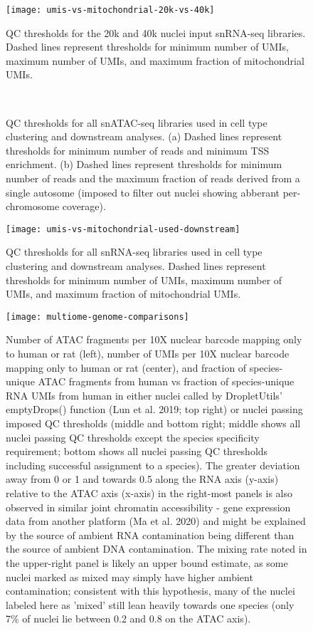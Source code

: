 \documentclass{article}
\begin{document}
\begin{figure}
\texttt{[image: umis-vs-mitochondrial-20k-vs-40k]}
\caption{QC thresholds for the 20k and 40k nuclei input snRNA-seq libraries. Dashed lines represent thresholds for minimum number of UMIs, maximum number of UMIs, and maximum fraction of mitochondrial UMIs.}
\end{figure} 

\begin{figure}
	\\
	\caption{QC thresholds for all snATAC-seq libraries used in cell type clustering and downstream analyses. (a) Dashed lines represent thresholds for minimum number of reads and minimum TSS enrichment. (b) Dashed lines represent thresholds for minimum number of reads and the maximum fraction of reads derived from a single autosome (imposed to filter out nuclei showing abberant per-chromosome coverage).}
\end{figure} 

\begin{figure}
\texttt{[image: umis-vs-mitochondrial-used-downstream]}
\caption{QC thresholds for all snRNA-seq libraries used in cell type clustering and downstream analyses. Dashed lines represent thresholds for minimum number of UMIs, maximum number of UMIs, and maximum fraction of mitochondrial UMIs.}
\end{figure} 

\begin{figure}
	\texttt{[image: multiome-genome-comparisons]}
	\caption{Number of ATAC fragments per 10X nuclear barcode mapping only to human or rat (left), number of UMIs per 10X nuclear barcode mapping only to human or rat (center), and fraction of species-unique ATAC fragments from human vs fraction of species-unique RNA UMIs from human in either nuclei called by DropletUtils' emptyDrops() function (Lun et al. 2019; top right) or nuclei passing imposed QC thresholds (middle and bottom right; middle shows all nuclei passing QC thresholds except the species specificity requirement; bottom shows all nuclei passing QC thresholds including successful assignment to a species). The greater deviation away from 0 or 1 and towards 0.5 along the RNA axis (y-axis) relative to the ATAC axis (x-axis) in the right-most panels is also observed in similar joint chromatin accessibility - gene expression data from another platform (Ma et al. 2020) and might be explained by the source of ambient RNA contamination being different than the source of ambient DNA contamination. The mixing rate noted in the upper-right panel is likely an upper bound estimate, as some nuclei marked as mixed may simply have higher ambient contamination; consistent with this hypothesis, many of the nuclei labeled here as 'mixed' still lean heavily towards one species (only 7\% of nuclei lie between 0.2 and 0.8 on the ATAC axis).}
\end{figure} 
\end{document}
